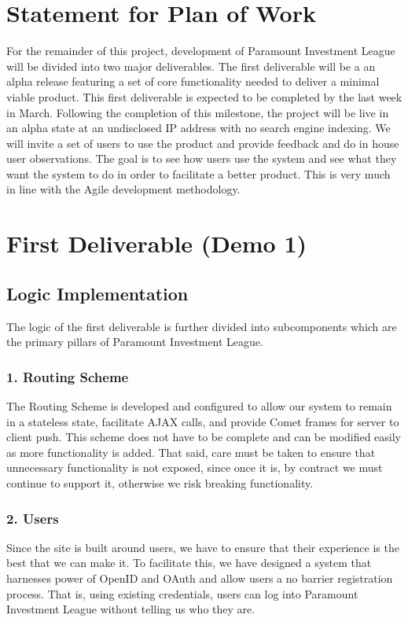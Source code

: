 \section{Statement for Plan of Work}
For the remainder of this project, development of Paramount Investment League
will be divided into two major deliverables. The first deliverable will be a
an alpha release featuring a set of core functionality needed to deliver a
minimal viable product. This first deliverable is expected to be completed by
the last week in March. Following the completion of this milestone, the project
will be live in an alpha state at an undisclosed IP address with no search engine
indexing.  We will invite a set of users to use the product and provide feedback
and do in house user observations.  The goal is to see how users use the system
and see what they want the system to do in order to facilitate a better product.
This is very much in line with the Agile development methodology.\\

\section{First Deliverable (Demo 1)}
\subsection{Logic Implementation}
The logic of the first deliverable is further divided into subcomponents which
are the primary pillars of Paramount Investment League. \\
\subsubsection{1. Routing Scheme}
The Routing Scheme is developed and configured to allow our system to remain
in a stateless state, facilitate AJAX calls, and provide Comet frames for server
to client push.  This scheme does not have to be complete and can be modified
easily as more functionality is added. That said, care must be taken to ensure
that unnecessary functionality is not exposed, since once it is, by contract we
must continue to support it, otherwise we risk breaking functionality.\\
\subsubsection{2. Users}
Since the site is built around users, we have to ensure that their experience is
the best that we can make it.  To facilitate this, we have designed a system
that harnesses power of OpenID\cite{wiki:open} and OAuth\cite{wiki:oauth} and
allow users a no barrier registration process.  That is, using existing
credentials, users can log into Paramount Investment League without telling us
who they are.\\
